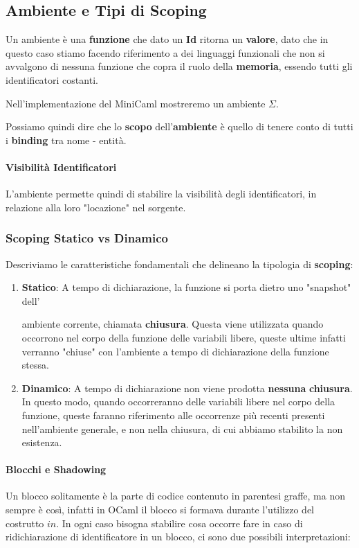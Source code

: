 \documentclass{article}
\begin{document}
\subsection{Ambiente e Tipi di Scoping}

Un ambiente è una \textbf{funzione} che dato un \textbf{Id} ritorna un \textbf{valore}, dato che in questo caso stiamo facendo riferimento a dei linguaggi funzionali che non si avvalgono di nessuna funzione che copra il ruolo della \textbf{memoria}, essendo tutti gli identificatori costanti.

Nell'implementazione del MiniCaml mostreremo un ambiente $\Sigma$.

Possiamo quindi dire che lo \textbf{scopo} dell'\textbf{ambiente} è quello di tenere conto di tutti i \textbf{binding} tra nome - entità.

\paragraph{Visibilità Identificatori} L'ambiente permette quindi di stabilire la visibilità degli identificatori, in relazione alla loro "locazione" nel sorgente.

\subsubsection{Scoping Statico vs Dinamico}

Descriviamo le caratteristiche fondamentali che delineano la tipologia di \textbf{scoping}:

\begin{enumerate}
    \item \textbf{Statico}: A tempo di dichiarazione, la funzione si porta dietro uno "snapshot" dell'
    
    ambiente corrente, chiamata \textbf{chiusura}. Questa viene utilizzata quando occorrono nel corpo della funzione delle variabili libere, queste ultime infatti verranno "chiuse" con l'ambiente a tempo di dichiarazione della funzione stessa.
    \item \textbf{Dinamico}: A tempo di dichiarazione non viene prodotta \textbf{nessuna} \textbf{chiusura}. In questo modo, quando occorreranno delle variabili libere nel corpo della funzione, queste faranno riferimento alle occorrenze più recenti presenti nell'ambiente generale, e non nella chiusura, di cui abbiamo stabilito la non esistenza. 
\end{enumerate}

\paragraph{Blocchi e Shadowing} Un blocco solitamente è la parte di codice contenuto in parentesi graffe, ma non sempre è così, infatti in OCaml il blocco si formava durante l'utilizzo del costrutto $in$. In ogni caso bisogna stabilire cosa occorre fare in caso di ridichiarazione di identificatore in un blocco, ci sono due possibili interpretazioni:
\end{document}
